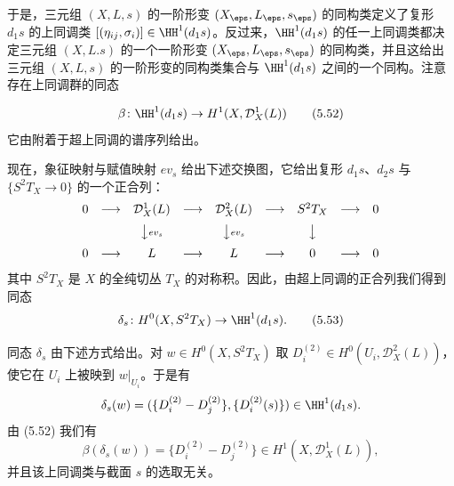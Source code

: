 
{\emergencystretch=22.3pt 于是，三元组 $(X,L,s)$ 的一阶形变 $(X_\eps,L_\eps,s_\eps)$ 的同构类定义了复形 $d_1s$ 的上同调类 $[(\eta_{ij},\sigma_i)]\in\HH^1(d_1s)$。反过来，$\HH^1(d_1s)$ 的任一上同调类都决定三元组 $(X,L.s)$ 的一个一阶形变 $(X_\eps,L_\eps,s_\eps)$ 的同构类，并且这给出三元组 $(X,L,s)$ 的一阶形变的同构类集合与 $\HH^1(d_1s)$ 之间的一个同构。注意存在上同调群的同态\par}
\begin{equation}
 \beta\colon\HH^1(d_1s)\to H^1(X,\mathcal D_X^1(L)) \tag{5.52}
\end{equation}
它由附着于超上同调的谱序列给出。

现在，象征映射与赋值映射 $ev_s$ 给出下述交换图，它给出复形 $d_1s$、$d_2s$ 与 $\{S^2T_X\to0\}$ 的一个正合列：
\[
 \begin{array}{ccccccccc}
 0 & \longrightarrow & \mathcal D_X^1(L) & \longrightarrow & \mathcal D_X^2(L) & \longrightarrow & S^2T_X & \longrightarrow & 0\\[2mm]
 & & \big\downarrow\hbox{\scriptsize $ev_s$} & & \big\downarrow\hbox{\scriptsize $ev_s$} & & \big\downarrow & & \\[2mm]
 0 & \longrightarrow & L & \longrightarrow & L & \longrightarrow & 0 & \longrightarrow & 0
 \end{array}
\]
其中 $S^2T_X$ 是 $X$ 的全纯切丛 $T_X$ 的对称积。因此，由超上同调的正合列我们得到同态
\begin{equation}
 \delta_s\colon H^0(X,S^2T_X)\to\HH^1(d_1s). \tag{5.53}
\end{equation}


同态 $\delta_s$ 由下述方式给出。对 $w\in H^0(X,S^2T_X)$ 取 $D_i^{(2)}\in H^0(U_i,\mathcal D_X^2(L))$，使它在 $U_i$ 上被映到 $w|_{U_i}$。于是有
\[
 \delta_s(w)=(\{D_i^{(2)}-D_j^{(2)}\},\{D_i^{(2)}(s)\})\in\HH^1(d_1s).
\]
由 (5.52) 我们有
\[
 \beta(\delta_s(w))=\{D_i^{(2)}-D_j^{(2)}\}\in H^1(X,\mathcal D_X^1(L)),
\]
并且该上同调类与截面 $s$ 的选取无关。


